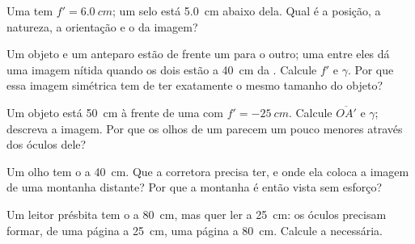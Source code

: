 \begin{exercise}[$\star\star$]\label{exo:g11:lenses-and-eye:7}
Uma  tem $f' = \qty{6.0}{cm}$; um selo está \qty{5.0}{cm} abaixo
dela. Qual é a posição, a natureza, a orientação e o  da imagem?
\end{exercise}

\begin{exercise}[$\star\star$]\label{exo:g11:lenses-and-eye:8}
Um objeto e um anteparo estão de frente um para o outro; uma  entre eles dá uma imagem nítida quando os dois estão a
\qty{40}{cm} da . Calcule $f'$ e $\gamma$. Por que essa imagem
simétrica tem de ter exatamente o mesmo tamanho do objeto?
\end{exercise}

\begin{exercise}[$\star\star$]\label{exo:g11:lenses-and-eye:9}
Um objeto está \qty{50}{cm} à frente de uma  com
$f' = \qty{-25}{cm}$. Calcule $\overline{OA'}$ e $\gamma$; descreva a
imagem. Por que os olhos de um  parecem um pouco menores através dos
óculos dele?
\end{exercise}

\begin{exercise}[$\star\star$]\label{exo:g11:lenses-and-eye:10}
Um olho  tem o  a \qty{40}{cm}. Que  a 
corretora precisa ter, e onde ela coloca a imagem de uma montanha
distante? Por que a montanha é então vista sem esforço?
\end{exercise}

\begin{exercise}[$\star\star$]\label{exo:g11:lenses-and-eye:11}
Um leitor présbita tem o  a \qty{80}{cm}, mas quer ler a
\qty{25}{cm}: os óculos precisam formar, de uma página a \qty{25}{cm},
uma página  a \qty{80}{cm}. Calcule a  necessária.
\end{exercise}

